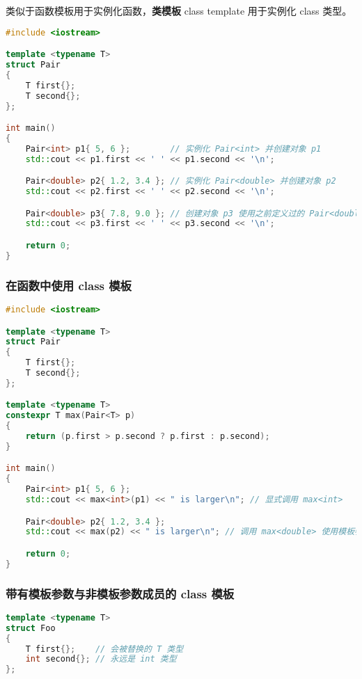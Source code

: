 \documentclass[../../LearnCpp.tex]{subfiles}
\begin{document}

类似于函数模板用于实例化函数，\textbf{类模板} class template 用于实例化 class 类型。

\begin{lstlisting}[language=C++]
#include <iostream>

template <typename T>
struct Pair
{
    T first{};
    T second{};
};

int main()
{
    Pair<int> p1{ 5, 6 };        // 实例化 Pair<int> 并创建对象 p1
    std::cout << p1.first << ' ' << p1.second << '\n';

    Pair<double> p2{ 1.2, 3.4 }; // 实例化 Pair<double> 并创建对象 p2
    std::cout << p2.first << ' ' << p2.second << '\n';

    Pair<double> p3{ 7.8, 9.0 }; // 创建对象 p3 使用之前定义过的 Pair<double>
    std::cout << p3.first << ' ' << p3.second << '\n';

    return 0;
}
\end{lstlisting}

\subsubsection*{在函数中使用 class 模板}

\begin{lstlisting}[language=C++]
#include <iostream>

template <typename T>
struct Pair
{
    T first{};
    T second{};
};

template <typename T>
constexpr T max(Pair<T> p)
{
    return (p.first > p.second ? p.first : p.second);
}

int main()
{
    Pair<int> p1{ 5, 6 };
    std::cout << max<int>(p1) << " is larger\n"; // 显式调用 max<int>

    Pair<double> p2{ 1.2, 3.4 };
    std::cout << max(p2) << " is larger\n"; // 调用 max<double> 使用模板参数推导（推荐）

    return 0;
}
\end{lstlisting}

\subsubsection*{带有模板参数与非模板参数成员的 class 模板}

\begin{lstlisting}[language=C++]
template <typename T>
struct Foo
{
    T first{};    // 会被替换的 T 类型
    int second{}; // 永远是 int 类型
};
\end{lstlisting}
\end{document}
